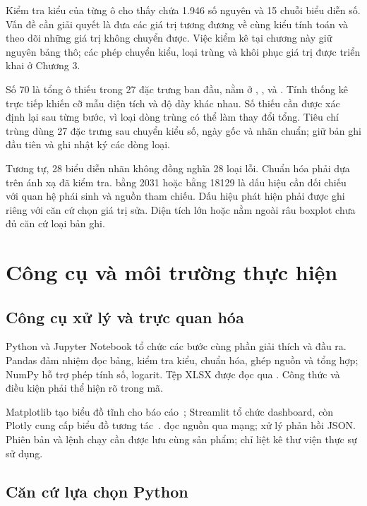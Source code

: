Kiểm tra kiểu của từng ô cho thấy  chứa 1.946 số nguyên và 15 chuỗi biểu diễn số. Vấn đề cần giải quyết là đưa các giá trị tương đương về cùng kiểu tính toán và theo dõi những giá trị không chuyển được. Việc kiểm kê tại chương này giữ nguyên bảng thô; các phép chuyển kiểu, loại trùng và khôi phục giá trị được triển khai ở Chương 3.

Số 70 là tổng ô thiếu trong 27 đặc trưng ban đầu, nằm ở , ,  và . Tính thống kê trực tiếp khiến cỡ mẫu diện tích và độ dày khác nhau. Số thiếu cần được xác định lại sau từng bước, vì loại dòng trùng có thể làm thay đổi tổng. Tiêu chí trùng dùng 27 đặc trưng sau chuyển kiểu số, ngày gốc và nhãn chuẩn; giữ bản ghi đầu tiên và ghi nhật ký các dòng loại.

Tương tự, 28 biểu diễn nhãn không đồng nghĩa 28 loại lỗi. Chuẩn hóa phải dựa trên ánh xạ đã kiểm tra.  bằng 2031 hoặc  bằng 18129 là dấu hiệu cần đối chiếu với quan hệ phái sinh và nguồn tham chiếu. Dấu hiệu phát hiện phải được ghi riêng với căn cứ chọn giá trị sửa. Diện tích lớn hoặc nằm ngoài râu boxplot chưa đủ căn cứ loại bản ghi.

\section{Công cụ và môi trường thực hiện}
\label{sec:congcu}

\subsection{Công cụ xử lý và trực quan hóa}

Python và Jupyter Notebook tổ chức các bước cùng phần giải thích và đầu ra. Pandas đảm nhiệm đọc bảng, kiểm tra kiểu, chuẩn hóa, ghép nguồn và tổng hợp; NumPy hỗ trợ phép tính số, logarit. Tệp XLSX được đọc qua . Công thức và điều kiện phải thể hiện rõ trong mã.

Matplotlib tạo biểu đồ tĩnh cho báo cáo~\cite{matplotlib}; Streamlit tổ chức dashboard, còn Plotly cung cấp biểu đồ tương tác~\cite{streamlit}.  đọc nguồn qua mạng;  xử lý phản hồi JSON. Phiên bản và lệnh chạy cần được lưu cùng sản phẩm; chỉ liệt kê thư viện thực sự sử dụng.

\subsection{Căn cứ lựa chọn Python}

